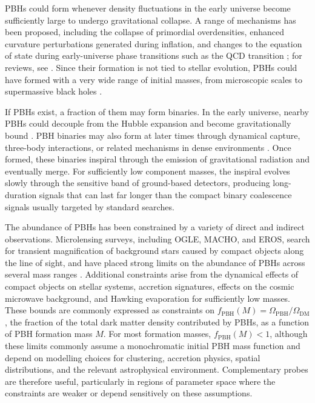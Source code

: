 \documentclass[aps,prd,amsmath,floats,floatfix, twocolumn,
superscriptaddress,nofootinbib,showpacs]{revtex4-2}
\newcommand{\red}{\textcolor{red}}
\begin{document}
PBHs could form whenever density fluctuations in the early universe become sufficiently large to undergo gravitational collapse. A range of mechanisms has been proposed, including the collapse of primordial overdensities, enhanced curvature perturbations generated during inflation, and changes to the equation of state during early-universe phase transitions such as the QCD transition \cite{Carr:1975qj, Escriva:2019phb, Carr:1993aq, Kannike:2017bxn, Crawford:1982yz, Carr:2019hud}; for reviews, see \cite{Escriva:2022duf, Carr:2020xqk}. Since their formation is not tied to stellar evolution, PBHs could have formed with a very wide range of initial masses, from microscopic scales to supermassive black holes \cite{Carr:2023tpt}. 

If PBHs exist, a fraction of them may form binaries. In the early universe, nearby PBHs could decouple from the Hubble expansion and become gravitationally bound \cite{Nakamura:1997sm, Raidal:2018bbj}. PBH binaries may also form at later times through dynamical capture, three-body interactions, or related mechanisms in dense environments \cite{Nishikawa:2017chy, Lehmann:2022vdt, Franciolini:2022ewd, Kritos:2020wcl}. Once formed, these binaries inspiral through the emission of gravitational radiation and eventually merge. For sufficiently low component masses, the inspiral evolves slowly through the sensitive band of ground-based detectors, producing long-duration signals that can last far longer than the compact binary coalescence signals usually targeted by standard searches.

The abundance of PBHs has been constrained by a variety of direct and indirect observations. Microlensing surveys, including OGLE, MACHO, and EROS, search for transient magnification of background stars caused by compact objects along the line of sight, and have placed strong limits on the abundance of PBHs across several mass ranges \cite{MACHO:1998qtf, Wilkinson:2001vv}. Additional constraints arise from the dynamical effects of compact objects on stellar systems, accretion signatures, effects on the cosmic microwave background, and Hawking evaporation for sufficiently low masses. These bounds are commonly expressed as constraints on $f_\mathrm{PBH}(M) = \Omega_\mathrm{PBH}/\Omega_\mathrm{DM}$, the fraction of the total dark matter density contributed by PBHs, as a function of PBH formation mass $M$. For most formation masses, $f_\mathrm{PBH}(M) < 1 $, although these limits commonly assume a monochromatic initial PBH mass function and depend on modelling choices for clustering, accretion physics, spatial distributions, and the relevant astrophysical environment. Complementary probes are therefore useful, particularly in regions of parameter space where the constraints are weaker or depend sensitively on these assumptions.
\end{document}
